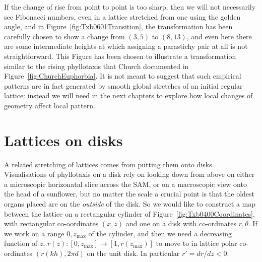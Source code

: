 %
%
If the change of rise from point to point is too sharp, 
then we will not necessarily see Fibonacci numbers, even in a lattice stretched from one using the golden angle, and in Figure~\ref{fig:Txb0601Transition}, the transformation has been carefully chosen to show a change from  $(3,5)$ to $(8,13)$, and even here there are some intermediate heights at which assigning a parastichy pair at all is not straightforward. 
This Figure has been chosen to illustrate a transformation similar to the 
 rising phyllotaxis that Church documented in Figure~\ref{fig:ChurchEuphorbia}. It is not meant to suggest that such empirical patterns are in fact generated by smooth global stretches of an initial regular lattice: instead we will need in the next chapters to explore how local changes of geometry affect local pattern.  



\section{Lattices on disks}
A related stretching of lattices comes from putting them onto disks. 
Visualisations of phyllotaxis on a disk rely on looking down from above on either a microscopic horizonatal slice across the SAM, or on a macroscopic view  onto the head of a sunflower, but no matter the scale a crucial point is that the oldest organs placed are on the \textit{outside} of the disk. 
So we would like to construct a map between the lattice on a rectangular cylinder of Figure~\ref{fig:Txb0400Coordinates}, with rectangular co-oordinates $(x,z)$ and one on a disk with co-ordinates $r,\theta$. If we work on a  range $0,z_{\text{max}}$ of the cylinder, and then we need a decreasing function of $z$, $r(z):[ 0,z_{\text{max}}]\rightarrow[ 1, r(z_{\text{max}})]$ to move to in lattice polar co-ordinates $(r(k h),2\pi d)$ on the unit disk. In particular $r'=dr/dz<0$. 

